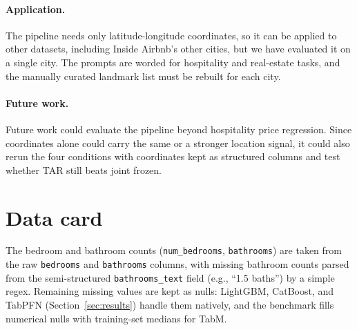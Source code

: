 \documentclass{article}
\begin{document}
\paragraph{Application.} The pipeline needs only latitude-longitude coordinates, so it can be applied to other datasets,
including Inside Airbnb's other cities, but we have evaluated it on a single city.
The prompts are worded for hospitality and real-estate tasks, and the manually curated landmark list must be rebuilt for each city.

\paragraph{Future work.} Future work could evaluate the pipeline beyond hospitality price regression. Since coordinates alone
could carry the same or a stronger location signal, it could also rerun the four conditions with coordinates kept as
structured columns and test whether TAR still beats joint frozen.


{\small


}



\appendix

\section{Data card}
\label{app:data-card}

The bedroom and bathroom counts (\texttt{num\_bedrooms}, \texttt{bathrooms}) are taken from the raw \texttt{bedrooms} and \texttt{bathrooms} columns,
with missing bathroom counts parsed from the semi-structured \texttt{bathrooms\_text} field (e.g., ``1.5 baths'') by a simple regex.
Remaining missing values are kept as nulls: LightGBM, CatBoost, and TabPFN (Section~\ref{sec:results}) handle them natively,
and the benchmark fills numerical nulls with training-set medians for TabM.
\end{document}
